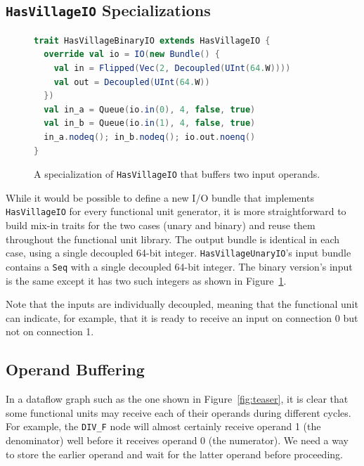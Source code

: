 \documentclass[sigconf, nonacm]{acmart}
\begin{document}
\subsection{\texttt{HasVillageIO} Specializations}
\label{sec:hasvillageio-specializations}

\begin{figure}
	\begin{center}
		\begin{lstlisting}[language=scala]
trait HasVillageBinaryIO extends HasVillageIO {
  override val io = IO(new Bundle() {
    val in = Flipped(Vec(2, Decoupled(UInt(64.W))))
    val out = Decoupled(UInt(64.W))
  })
  val in_a = Queue(io.in(0), 4, false, true)
  val in_b = Queue(io.in(1), 4, false, true)
  in_a.nodeq(); in_b.nodeq(); io.out.noenq()
}
		\end{lstlisting}
	\end{center}
	\caption{A specialization of \texttt{HasVillageIO} that buffers two input operands.}
	\label{fig:village-io-def}
\end{figure}

While it would be possible to define a new I/O bundle that implements \texttt{HasVillageIO} for every functional unit generator, it is more straightforward to build mix-in traits for the two cases (unary and binary) and reuse them throughout the functional unit library.
The output bundle is identical in each case, using a single decoupled 64-bit integer.
\texttt{HasVillageUnaryIO}'s input bundle contains a \texttt{Seq} with a single decoupled 64-bit integer.
The binary version's input is the same except it has two such integers as shown in Figure~\ref{fig:village-io-def}.

Note that the inputs are individually decoupled, meaning that the functional unit can indicate, for example, that it is ready to receive an input on connection 0 but not on connection 1.

\subsection{Operand Buffering}

In a dataflow graph such as the one shown in Figure~\ref{fig:teaser}, it is clear that some functional units may receive each of their operands during different cycles.
For example, the \texttt{DIV\_F} node will almost certainly receive operand 1 (the denominator) well before it receives operand 0 (the numerator).
We need a way to store the earlier operand and wait for the latter operand before proceeding.
\end{document}
